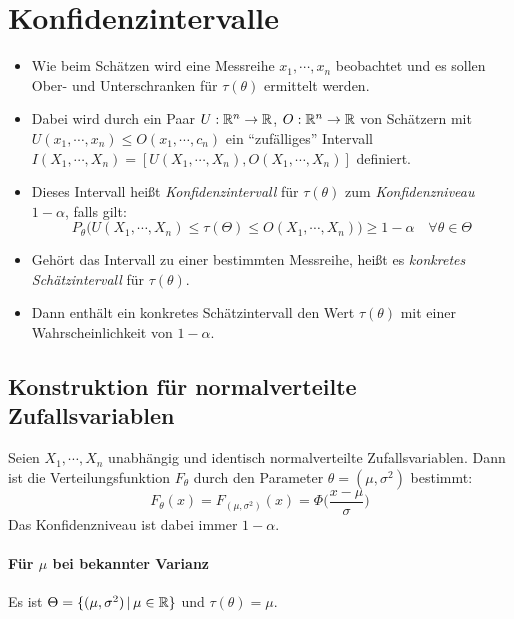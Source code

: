 	\section{Konfidenzintervalle}
		\begin{itemize}
			\item Wie beim Schätzen wird eine Messreihe \(x_1, \cdots, x_n\) beobachtet und es sollen Ober- und Unterschranken für \( \tau(\theta) \) ermittelt werden.
			\item Dabei wird durch ein Paar \( U : \mathbb{R}^n \rightarrow \mathbb{R} \), \( O : \mathbb{R}^n \rightarrow \mathbb{R} \) von Schätzern mit \( U(x_1, \cdots, x_n) \leq O(x_1, \cdots, c_n) \) ein \enquote{zufälliges} Intervall \( I(X_1, \cdots, X_n) = [U(X_1, \cdots, X_n), O(X_1, \cdots, X_n)] \) definiert.
			\item Dieses Intervall heißt \textit{Konfidenzintervall} für \(\tau(\theta)\) zum \textit{Konfidenzniveau} \( 1 - \alpha \), falls gilt:
				\begin{equation*}
					P_\theta\big(U(X_1, \cdots, X_n) \leq \tau(\Theta) \leq O(X_1, \cdots, X_n)\big) \geq 1 - \alpha \quad \forall \theta \in \Theta
				\end{equation*}
			\item Gehört das Intervall zu einer bestimmten Messreihe, heißt es \textit{konkretes Schätzintervall} für \(\tau(\theta)\).
			\item Dann enthält ein konkretes Schätzintervall den Wert \(\tau(\theta)\) mit einer Wahrscheinlichkeit von \( 1 - \alpha \).
		\end{itemize}

		\subsection{Konstruktion für normalverteilte Zufallsvariablen}
			Seien \(X_1, \cdots, X_n\) unabhängig und identisch normalverteilte Zufallsvariablen. Dann ist die Verteilungsfunktion \(F_\theta\) durch den Parameter \( \theta = (\mu, \sigma^2) \) bestimmt:
			\begin{equation*}
				F_\theta(x) = F_{(\mu, \sigma^2)}(x) = \Phi\bigg(\frac{x - \mu}{\sigma}\bigg)
			\end{equation*}
			Das Konfidenzniveau ist dabei immer \( 1 - \alpha \).

			\paragraph{Für \(\mu\) bei bekannter Varianz}
				Es ist \( \Theta = \{ (\mu, \sigma^2) \,\vert\, \mu \in \mathbb{R} \} \) und \( \tau(\theta) = \mu \).

